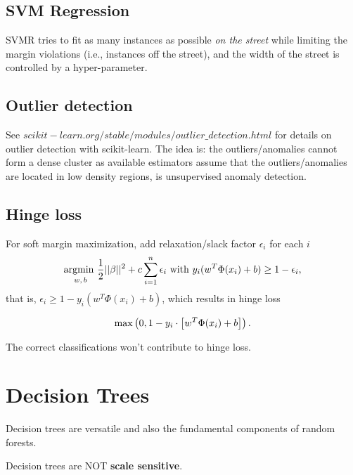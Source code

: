 \documentclass[12pt,oneside,a4paper]{article}
\numberwithin{equation}{section}
\newcommand{\argmin}[1]{\stackunder{\textrm{argmin }}{\scriptsize$#1$}}
\newcommand{\rmmax}[1]{\stackunder{\textrm{max}}{\scriptsize$#1$}}
\begin{document}
\subsection{SVM Regression}

SVMR tries to fit as many instances as possible \emph{on the street} while limiting the margin violations (i.e., instances off the street), and the width of the street is controlled by a hyper-parameter. 

\subsection{Outlier detection}
See \href{https://scikit-learn.org/stable/modules/outlier_detection.html}{$scikit-learn.org/stable/modules/outlier\_detection.html$} for details on outlier detection with scikit-learn. The idea is: the outliers/anomalies cannot form a dense cluster as available estimators assume that the outliers/anomalies are located in low density regions, is unsupervised anomaly detection.

\subsection{Hinge loss}
For soft margin maximization, add relaxation/slack factor $\epsilon_i$ for each $i$
\begin{equation}
\argmin{w,b}\frac{1}{2}||\beta||^2 + c \sum_{i=1}^{n}\epsilon_i\textrm{ with } y_i(w^T\Phi(x_i) + b) \ge 1 - \epsilon_i,
\end{equation}
that is, $\epsilon_i \ge 1- y_i(w^T\Phi(x_i) + b) $, which results in hinge loss

\begin{equation}
\rmmax{}\left(0, 1- y_i \cdot \left[w^T\Phi(x_i) + b\right]\right).
\end{equation}

The correct classifications won't contribute to hinge loss.

\section{Decision Trees}
Decision trees are versatile and also the fundamental components of random forests. 

Decision trees are NOT \textbf{scale sensitive}.
\end{document}
